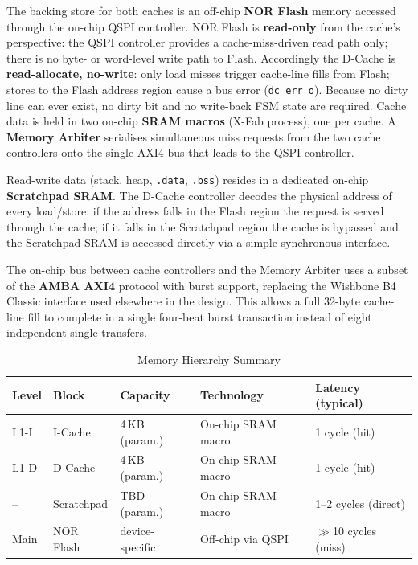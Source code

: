 The backing store for both caches is an off-chip \textbf{NOR Flash} memory
accessed through the on-chip QSPI controller.
NOR Flash is \textbf{read-only} from the cache's perspective: the QSPI
controller provides a cache-miss-driven read path only; there is no
byte- or word-level write path to Flash.
Accordingly the D-Cache is \textbf{read-allocate, no-write}: only load misses
trigger cache-line fills from Flash; stores to the Flash address region cause a
bus error (\texttt{dc\_err\_o}).
Because no dirty line can ever exist, no dirty bit and no write-back FSM state
are required.
Cache data is held in two on-chip \textbf{SRAM macros} (X-Fab process),
one per cache.
A \textbf{Memory Arbiter} serialises simultaneous miss requests from the two
cache controllers onto the single AXI4 bus that leads to the QSPI controller.

Read-write data (stack, heap, \texttt{.data}, \texttt{.bss}) resides in a
dedicated on-chip \textbf{Scratchpad SRAM}.
The D-Cache controller decodes the physical address of every load/store: if
the address falls in the Flash region the request is served through the cache;
if it falls in the Scratchpad region the cache is bypassed and the Scratchpad
SRAM is accessed directly via a simple synchronous interface.

The on-chip bus between cache controllers and the Memory Arbiter uses a
subset of the \textbf{AMBA AXI4} protocol with burst support, replacing the
Wishbone B4 Classic interface used elsewhere in the design.
This allows a full 32-byte cache-line fill to complete in a single
four-beat burst transaction instead of eight independent single transfers.

\begin{table}[H]
\caption{Memory Hierarchy Summary}
\label{tab:asMemHierarchy}
\centering
\begin{tabularx}{\textwidth}{|l |l |l |l |X|}
  \hline
  Level & Block & Capacity & Technology & Latency (typical) \\
  \hline
  \hline
  L1-I & I-Cache    & 4\,KB (param.)  & On-chip SRAM macro  & 1 cycle (hit) \\
  \hline
  L1-D & D-Cache    & 4\,KB (param.)  & On-chip SRAM macro  & 1 cycle (hit) \\
  \hline
  --   & Scratchpad & TBD (param.)    & On-chip SRAM macro  & 1--2 cycles (direct) \\
  \hline
  Main & NOR Flash  & device-specific & Off-chip via QSPI   & \(\gg\)10 cycles (miss) \\
  \hline
\end{tabularx}
\end{table}

